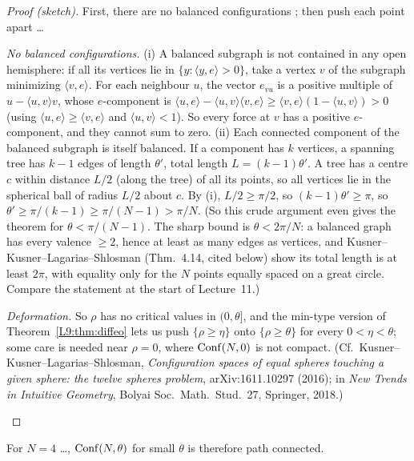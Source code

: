 \begin{proof}[Proof (sketch)]
First, there are no balanced configurations ;
then push each point apart \dots
\begin{addedblock}
\emph{No balanced configurations.} (i) A balanced subgraph is not contained in any open hemisphere:
if all its vertices lie in $\{y:\langle y,e\rangle>0\}$, take a vertex $v$ of the subgraph minimizing
$\langle v,e\rangle$. For each neighbour $u$, the vector $e_{vu}$ is a positive multiple of
$u-\langle u,v\rangle v$, whose $e$-component is $\langle u,e\rangle-\langle u,v\rangle\langle v,e\rangle
\ge\langle v,e\rangle(1-\langle u,v\rangle)>0$ (using $\langle u,e\rangle\ge\langle v,e\rangle$ and $\langle u,v\rangle<1$). So every force at $v$ has a positive $e$-component,
and they cannot sum to zero.
(ii) Each connected component of the balanced subgraph is itself balanced. If a component has $k$
vertices, a spanning tree has $k-1$ edges of length $\theta'$, total length $L=(k-1)\theta'$. A tree
has a centre $c$ within distance $L/2$ (along the tree) of all its points, so all vertices lie in the
spherical ball of radius $L/2$ about $c$. By (i), $L/2\ge\pi/2$, so $(k-1)\theta'\ge\pi$, so
$\theta'\ge\pi/(k-1)\ge\pi/(N-1)>\pi/N$.
(So this crude argument even gives the theorem for $\theta<\pi/(N-1)$. The sharp bound is
$\theta<2\pi/N$: a balanced graph has every valence $\ge2$, hence at least as many edges as
vertices, and Kusner--Kusner--Lagarias--Shlosman (Thm.~4.14, cited below) show its total length is at least
$2\pi$, with equality only for the $N$ points equally spaced on a great circle. Compare the
statement at the start of Lecture~11.)

\emph{Deformation.} So $\rho$ has no critical values in $(0,\theta]$, and the min-type version of
Theorem~\ref{L9:thm:diffeo} lets us push $\{\rho\ge\eta\}$ onto $\{\rho\ge\theta\}$ for every
$0<\eta<\theta$; some care is needed near $\rho=0$, where $\operatorname{Conf}(N,0)$ is not compact. (Cf.\
Kusner--Kusner--Lagarias--Shlosman, \emph{Configuration spaces of equal spheres touching a given
sphere: the twelve spheres problem}, arXiv:1611.10297 (2016); in \emph{New Trends in Intuitive
Geometry}, Bolyai Soc.\ Math.\ Stud.\ 27, Springer, 2018.)
\end{addedblock}
\end{proof}

For $N=4$ \dots, $\operatorname{Conf}(N,\theta)$ for small $\theta$ is therefore path connected.
\unclear{``$N=4$'' or ``$N>4$''}

